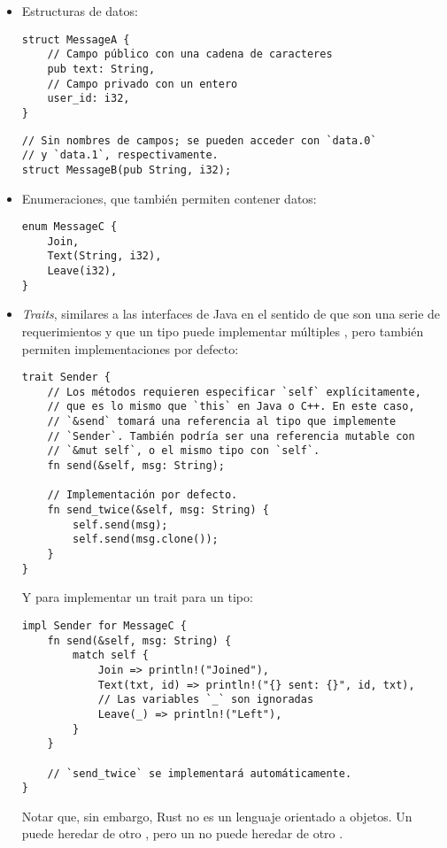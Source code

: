 \begin{itemize}
    \item Estructuras de datos:

\begin{verbatim}
struct MessageA {
    // Campo público con una cadena de caracteres
    pub text: String,
    // Campo privado con un entero
    user_id: i32,
}
\end{verbatim}

\begin{verbatim}
// Sin nombres de campos; se pueden acceder con `data.0`
// y `data.1`, respectivamente.
struct MessageB(pub String, i32);
\end{verbatim}

    \item Enumeraciones, que también permiten contener datos:

\begin{verbatim}
enum MessageC {
    Join,
    Text(String, i32),
    Leave(i32),
}
\end{verbatim}

    \item \emph{Traits}, similares a las interfaces de Java en el sentido de que
        son una serie de requerimientos y que un tipo puede implementar
        múltiples \traits, pero también permiten implementaciones por defecto:

\begin{verbatim}
trait Sender {
    // Los métodos requieren especificar `self` explícitamente,
    // que es lo mismo que `this` en Java o C++. En este caso,
    // `&send` tomará una referencia al tipo que implemente
    // `Sender`. También podría ser una referencia mutable con
    // `&mut self`, o el mismo tipo con `self`.
    fn send(&self, msg: String);

    // Implementación por defecto.
    fn send_twice(&self, msg: String) {
        self.send(msg);
        self.send(msg.clone());
    }
}
\end{verbatim}

        Y para implementar un trait para un tipo:

\begin{verbatim}
impl Sender for MessageC {
    fn send(&self, msg: String) {
        match self {
            Join => println!("Joined"),
            Text(txt, id) => println!("{} sent: {}", id, txt),
            // Las variables `_` son ignoradas
            Leave(_) => println!("Left"),
        }
    }

    // `send_twice` se implementará automáticamente.
}
\end{verbatim}

    Notar que, sin embargo, Rust no es un lenguaje orientado a objetos. Un
    \trait puede heredar de otro \trait, pero un \struct no puede heredar de
    otro \struct.

\end{itemize}

